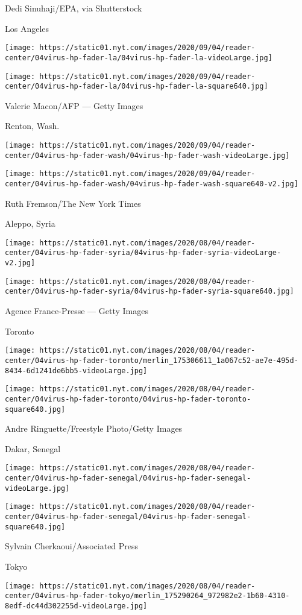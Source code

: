  Dedi Sinuhaji/EPA, via Shutterstock

Los Angeles

\texttt{[image: https://static01.nyt.com/images/2020/09/04/reader-center/04virus-hp-fader-la/04virus-hp-fader-la-videoLarge.jpg]}

\texttt{[image: https://static01.nyt.com/images/2020/09/04/reader-center/04virus-hp-fader-la/04virus-hp-fader-la-square640.jpg]}

 Valerie Macon/AFP --- Getty Images

Renton, Wash.

\texttt{[image: https://static01.nyt.com/images/2020/09/04/reader-center/04virus-hp-fader-wash/04virus-hp-fader-wash-videoLarge.jpg]}

\texttt{[image: https://static01.nyt.com/images/2020/09/04/reader-center/04virus-hp-fader-wash/04virus-hp-fader-wash-square640-v2.jpg]}

 Ruth Fremson/The New York Times

Aleppo, Syria

\texttt{[image: https://static01.nyt.com/images/2020/08/04/reader-center/04virus-hp-fader-syria/04virus-hp-fader-syria-videoLarge-v2.jpg]}

\texttt{[image: https://static01.nyt.com/images/2020/08/04/reader-center/04virus-hp-fader-syria/04virus-hp-fader-syria-square640.jpg]}

 Agence France-Presse --- Getty Images

Toronto

\texttt{[image: https://static01.nyt.com/images/2020/08/04/reader-center/04virus-hp-fader-toronto/merlin\_175306611\_1a067c52-ae7e-495d-8434-6d1241de6bb5-videoLarge.jpg]}

\texttt{[image: https://static01.nyt.com/images/2020/08/04/reader-center/04virus-hp-fader-toronto/04virus-hp-fader-toronto-square640.jpg]}

 Andre Ringuette/Freestyle Photo/Getty Images

Dakar, Senegal

\texttt{[image: https://static01.nyt.com/images/2020/08/04/reader-center/04virus-hp-fader-senegal/04virus-hp-fader-senegal-videoLarge.jpg]}

\texttt{[image: https://static01.nyt.com/images/2020/08/04/reader-center/04virus-hp-fader-senegal/04virus-hp-fader-senegal-square640.jpg]}

 Sylvain Cherkaoui/Associated Press

Tokyo

\texttt{[image: https://static01.nyt.com/images/2020/08/04/reader-center/04virus-hp-fader-tokyo/merlin\_175290264\_972982e2-1b60-4310-8edf-dc44d302255d-videoLarge.jpg]}

